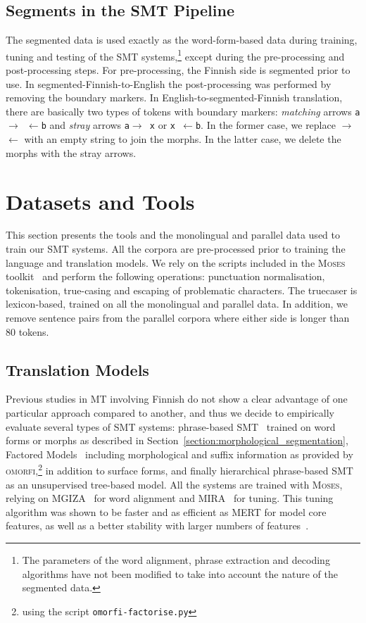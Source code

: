 \documentclass[postprint]{flammie}
\begin{document}
%
\subsection{Segments in the SMT Pipeline}
\label{subsection:segments_pipeline}
%
The segmented data is used exactly as the word-form-based data during training, tuning and testing of the SMT systems,\footnote{The parameters of the word alignment, phrase extraction and decoding algorithms have not been modified to take into account the nature of the segmented data.} except during the pre-processing and post-processing steps.
For pre-processing, the Finnish side is segmented prior to use. 
In segmented-Finnish-to-English the post-processing was performed by removing the boundary markers. In English-to-segmented-Finnish translation, there are basically two types of tokens with boundary markers: \textit{matching} arrows \texttt{a$\rightarrow$ $\leftarrow$b} and \textit{stray} arrows \texttt{a$\rightarrow$ x} or \texttt{x $\leftarrow$b}. In the former case, we replace \texttt{$\rightarrow$ $\leftarrow$} with an empty string to join the morphs. In the latter case, we delete the morphs with the stray arrows.

%
\section{Datasets and Tools}
\label{section:datasets_and_tools}
%
This section presents the tools and the monolingual and parallel data used to train our SMT systems. All the corpora are pre-processed prior to training the language and translation models. We rely on the scripts included in the \textsc{Moses} toolkit~\cite{koehn2007moses} and perform the following operations: punctuation normalisation, tokenisation, true-casing and escaping of problematic characters. The truecaser is lexicon-based, trained on all the monolingual and parallel data. In addition, we remove sentence pairs from the parallel corpora where either side is longer than $80$ tokens.
%

\subsection{Translation Models}
\label{subsection:translation_model}
%
Previous studies in MT involving Finnish do not show a clear advantage of one particular approach compared to another, and thus we decide to empirically evaluate several types of SMT systems: phrase-based SMT~\cite{och2004alignment} trained on word forms or morphs as described in Section~\ref{section:morphological_segmentation}, Factored Models~\cite{koehn2007factored} including morphological and suffix information as provided by \textsc{omorfi},\footnote{using the script \texttt{omorfi-factorise.py}} in addition to surface forms, and finally hierarchical phrase-based SMT~\cite{chiang2005hierarchical} as an unsupervised tree-based model. All the systems are trained with \textsc{Moses}, relying on \textsc{MGIZA}~\cite{gao2008parallel} for word alignment
and MIRA~\cite{watanabe-EtAl:2007:EMNLP-CoNLL2007} for tuning. This tuning algorithm was shown to be faster and as efficient as MERT for model core features, as well as a better stability with larger numbers of features~\cite{hasler2011margin}.
%
\end{document}
